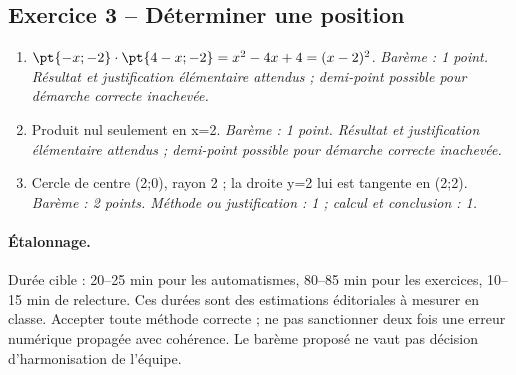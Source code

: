 \subsection*{Exercice 3 -- Déterminer une position}
\begin{enumerate}
\item $\pt{-x;-2}\cdot\pt{4-x;-2}=x^2-4x+4=(x-2)^2$. \textit{Barème : 1 point. Résultat et justification élémentaire attendus ; demi-point possible pour démarche correcte inachevée.}
\item Produit nul seulement en x=2. \textit{Barème : 1 point. Résultat et justification élémentaire attendus ; demi-point possible pour démarche correcte inachevée.}
\item Cercle de centre (2;0), rayon 2 ; la droite y=2 lui est tangente en (2;2). \textit{Barème : 2 points. Méthode ou justification : 1 ; calcul et conclusion : 1.}
\end{enumerate}
\paragraph{Étalonnage.} Durée cible : 20–25 min pour les automatismes, 80–85 min pour les exercices, 10–15 min de relecture. Ces durées sont des estimations éditoriales à mesurer en classe. Accepter toute méthode correcte ; ne pas sanctionner deux fois une erreur numérique propagée avec cohérence. Le barème proposé ne vaut pas décision d’harmonisation de l’équipe.
